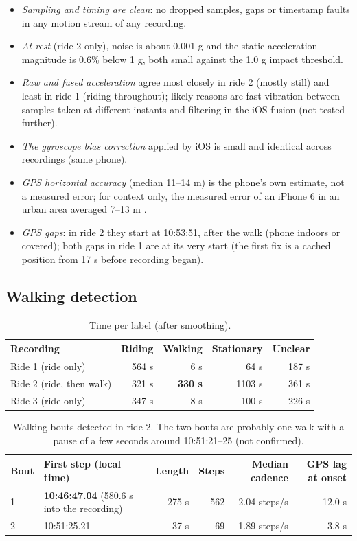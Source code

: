 \begin{itemize}
\item \emph{Sampling and timing are clean}: no dropped samples, gaps or timestamp faults in
  any motion stream of any recording.
\item \emph{At rest} (ride 2 only), noise is about 0.001 g and the static acceleration
  magnitude is 0.6\% below 1 g, both small against the 1.0 g impact threshold.
\item \emph{Raw and fused acceleration} agree most closely in ride 2 (mostly still) and least
  in ride 1 (riding throughout); likely reasons are fast vibration between samples taken
  at different instants and filtering in the iOS fusion (not tested further).
\item \emph{The gyroscope bias correction} applied by iOS is small and identical across
  recordings (same phone).
\item \emph{GPS horizontal accuracy} (median 11--14 m) is the phone's own estimate, not a
  measured error; for context only, the measured error of an iPhone 6 in an urban area
  averaged 7--13 m \autocite{merry2019}.
\item \emph{GPS gaps}: in ride 2 they start at 10:53:51, after the walk (phone indoors or
  covered); both gaps in ride 1 are at its very start (the first fix is a cached position
  from 17 s before recording began).
\end{itemize}

\subsection{Walking detection}

\begin{table}[htbp]
\centering\small
\caption{Time per label (after smoothing).}\label{tab:Blabels}
\begin{tabular}{@{}lrrrr@{}}
\toprule
Recording & Riding & Walking & Stationary & Unclear \\
\midrule
Ride 1 (ride only) & 564 s & 6 s & 64 s & 187 s \\
Ride 2 (ride, then walk) & 321 s & \textbf{330 s} & 1103 s & 361 s \\
Ride 3 (ride only) & 347 s & 8 s & 100 s & 226 s \\
\bottomrule
\end{tabular}
\end{table}

\begin{table}[htbp]
\centering\small
\caption{Walking bouts detected in ride 2. The two bouts are probably one walk with a
pause of a few seconds around 10:51:21--25 (not confirmed).}\label{tab:Bbouts}
\begin{tabular}{@{}llrrrr@{}}
\toprule
Bout & First step (local time) & Length & Steps & Median cadence & GPS lag at onset \\
\midrule
1 & \textbf{10:46:47.04} (580.6 s into the recording) & 275 s & 562 & 2.04 steps/s & 12.0 s \\
2 & 10:51:25.21 & 37 s & 69 & 1.89 steps/s & 3.8 s \\
\bottomrule
\end{tabular}
\end{table}

